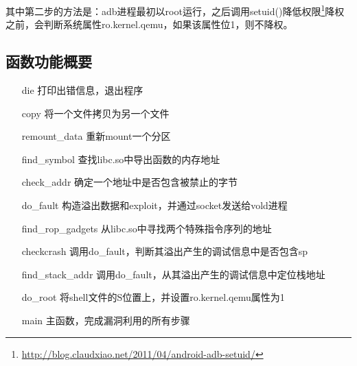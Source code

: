 其中第二步的方法是：adb进程最初以root运行，之后调用setuid()降低权限\footnote{\href{http://blog.claudxiao.net/2011/04/android-adb-setuid/}{http://blog.claudxiao.net/2011/04/android-adb-setuid/}}降权之前，会判断系统属性ro.kernel.qemu，如果该属性位1，则不降权。

\subsection{函数功能概要}

\begin{itemize}
\item[die] 打印出错信息，退出程序
\item[copy] 将一个文件拷贝为另一个文件
\item[remount\_data] 重新mount一个分区
\item[find\_symbol] 查找libc.so中导出函数的内存地址
\item[check\_addr] 确定一个地址中是否包含被禁止的字节
\item[do\_fault] 构造溢出数据和exploit，并通过socket发送给vold进程
\item[find\_rop\_gadgets] 从libc.so中寻找两个特殊指令序列的地址
\item[checkcrash] 调用do\_fault，判断其溢出产生的调试信息中是否包含sp
\item[find\_stack\_addr] 调用do\_fault，从其溢出产生的调试信息中定位栈地址
\item[do\_root] 将shell文件的S位置上，并设置ro.kernel.qemu属性为1
\item[main] 主函数，完成漏洞利用的所有步骤
\end{itemize}

